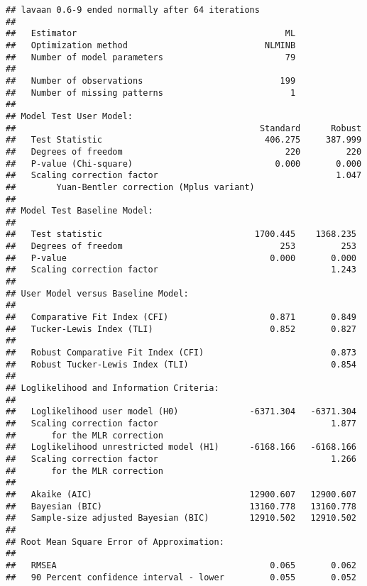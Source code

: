 \documentclass[
  english,
  man]{apa6}
\begin{document}
\begin{verbatim}
## lavaan 0.6-9 ended normally after 64 iterations
## 
##   Estimator                                         ML
##   Optimization method                           NLMINB
##   Number of model parameters                        79
##                                                       
##   Number of observations                           199
##   Number of missing patterns                         1
##                                                       
## Model Test User Model:
##                                                Standard      Robust
##   Test Statistic                                406.275     387.999
##   Degrees of freedom                                220         220
##   P-value (Chi-square)                            0.000       0.000
##   Scaling correction factor                                   1.047
##        Yuan-Bentler correction (Mplus variant)                     
## 
## Model Test Baseline Model:
## 
##   Test statistic                              1700.445    1368.235
##   Degrees of freedom                               253         253
##   P-value                                        0.000       0.000
##   Scaling correction factor                                  1.243
## 
## User Model versus Baseline Model:
## 
##   Comparative Fit Index (CFI)                    0.871       0.849
##   Tucker-Lewis Index (TLI)                       0.852       0.827
##                                                                   
##   Robust Comparative Fit Index (CFI)                         0.873
##   Robust Tucker-Lewis Index (TLI)                            0.854
## 
## Loglikelihood and Information Criteria:
## 
##   Loglikelihood user model (H0)              -6371.304   -6371.304
##   Scaling correction factor                                  1.877
##       for the MLR correction                                      
##   Loglikelihood unrestricted model (H1)      -6168.166   -6168.166
##   Scaling correction factor                                  1.266
##       for the MLR correction                                      
##                                                                   
##   Akaike (AIC)                               12900.607   12900.607
##   Bayesian (BIC)                             13160.778   13160.778
##   Sample-size adjusted Bayesian (BIC)        12910.502   12910.502
## 
## Root Mean Square Error of Approximation:
## 
##   RMSEA                                          0.065       0.062
##   90 Percent confidence interval - lower         0.055       0.052

\end{verbatim}
\end{document}
